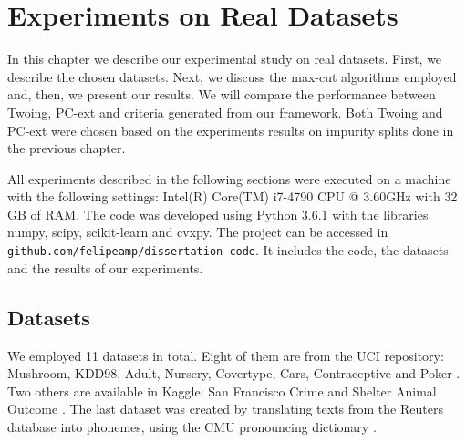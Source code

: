 \newpage

\chapter{Experiments on Real Datasets}
\label{chap:experimentsdatasets}


In this chapter we describe our experimental study on real datasets. First, we describe the chosen datasets. Next, we discuss the max-cut algorithms 
employed and, then, we present our results. We will compare the performance between Twoing, PC-ext and criteria generated from our framework. Both Twoing and PC-ext were chosen based on the experiments results on impurity splits done in the previous chapter.

All  experiments described in the following sections were executed on a machine with the following settings: Intel(R) Core(TM) i7-4790 CPU @ 3.60GHz with 32 GB of RAM. The code was developed using Python 3.6.1 with the libraries numpy, scipy, scikit-learn and cvxpy.
The project can be accessed in {\tt github.com/felipeamp/dissertation-code}. It includes the code, the datasets and the results of our experiments.


\section{Datasets}
We employed 11 datasets in total. Eight of them are from the UCI repository:
Mushroom, KDD98, Adult, Nursery, Covertype, Cars, Contraceptive and Poker  \cite{Lichman:2013}.
Two others are available in Kaggle: San Francisco Crime and Shelter Animal Outcome
\cite{SFC,AnimalShelter}. The last dataset was created by translating texts from the Reuters database \cite{Lichman:2013} into phonemes, using the CMU pronouncing dictionary \cite{CMU-PD}.

